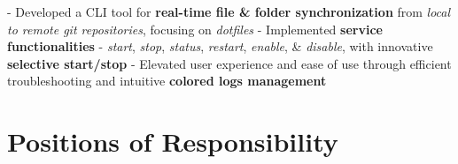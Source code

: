 \documentclass[a4paper,10pt]{extarticle} %
\begin{document}
\begin{description}[style=nextline, font=$\bullet$\hspace{2mm}\normalsize]
 \item[{\href{https://github.com/proffapt/gsync}{GSYNC}} | Bash, Linux Utilities] 
- Developed a CLI tool for \textbf{real-time file \& folder synchronization} from \textit{local to remote git repositories}, focusing on \textit{dotfiles} \newline
- Implemented \textbf{service functionalities} - \textit{start}, \textit{stop}, \textit{status}, \textit{restart}, \textit{enable}, \& \textit{disable}, with innovative \textbf{selective start/stop} \newline
- Elevated user experience and ease of use through efficient troubleshooting and intuitive \textbf{colored logs management}

\end{description}

\vspace{-0.1cm}
 \section{\textcolor{primary}{Positions of Responsibility}}
\vspace{+0.2cm}
\end{document}
